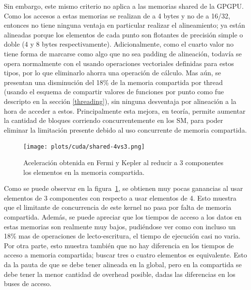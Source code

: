 Sin embargo, este mismo criterio no aplica a las memorias shared de la GPGPU. Como los accesos
a estas memorias se realizan de a 4 bytes y no de a 16/32, entonces no tiene ninguna ventaja
en particular realizar el alineamiento; ya est\'an alineadas porque los elementos de cada punto
son flotantes de precisi\'on simple o doble (4 y 8 bytes respectivamente). Adicionalmente, como el
cuarto valor no tiene forma de marcarse como algo que no sea padding de alineaci\'on, todav\'ia se
opera normalmente con el usando operaciones vectoriales definidas para estos tipos, por lo que
eliminarlo ahorra una operaci\'on de c\'alculo. Mas a\'un, se presentan una disminuci\'on del 18\%
de la memoria compartida por thread (usando el esquema de compartir valores de funciones por punto
como fue descripto en la secci\'on \ref{threading}), sin ninguna desventaja por alineaci\'on a la hora de acceder a estos.
Principalmente esta mejora, en teor\'ia, permite
aumentar la cantidad de bloques corriendo concurrentemente en los SM, para poder eliminar
la limitaci\'on presente debido al uso concurrente de memoria compartida.

\begin{figure}[htbp]
   \centering
   \texttt{[image: plots/cuda/shared-4vs3.png]}
   \caption{Aceleraci\'on obtenida en Fermi y Kepler al reducir a 3 componentes los
   elementos en la memoria compartida.}
   \label{fig:shared4vs3}
\end{figure}

Como se puede observar en la figura~\ref{fig:shared4vs3}, se obtienen muy pocas ganancias al usar elementos
de 3 componentes con respecto a usar elementos de 4. Esto muestra que el limitante de concurrencia
de este kernel no pasa por falta de memoria compartida. Adem\'as, se puede apreciar que los
tiempos de acceso a los datos en estas memorias son realmente muy bajos, pudi\'endose ver
como con incluso un 18\% mas de operaciones de lecto-escritura, el tiempo de ejecuci\'on casi no varia. Por
otra parte, esto muestra tambi\'en que no hay diferencia en los tiempos de acceso a memoria compartida; buscar
tres o cuatro elementos es equivalente. Esto da la pauta de que se debe tener alineada en la global, pero
en la compartida se debe tener la menor cantidad de overhead posible, dadas las diferencias en los buses de acceso.


